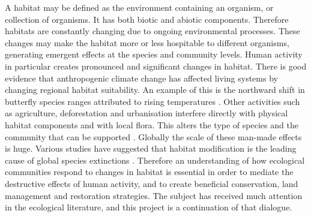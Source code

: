%	 
%	




A habitat may be defined as the environment containing an organism, or collection of organisms. It has both biotic and abiotic components. Therefore habitats are constantly changing due to ongoing environmental processes. These changes may make the habitat more or less hospitable to different organisms, generating emergent effects at the species and community levels. Human activity in particular creates pronounced and significant changes in habitat. There is good evidence \cite{parmesan2003globally} that anthropogenic climate change has affected living systems by changing regional habitat suitability. An example of this is the northward shift in butterfly species ranges attributed to rising temperatures \cite{parmesan1999poleward}. Other activities such as agriculture, deforestation and urbanisation interfere directly with physical habitat components and with local flora. This alters the type of species and the community that can be supported \cite{bossio2005soil, kremen2007pollination}. Globally the scale of these man-made effects is huge. Various studies have suggested that habitat modification is the leading cause of global species extinctions \cite{foley2005global,tylianakis2007habitat}. Therefore an understanding of how ecological communities respond to changes in habitat is essential in order to mediate the destructive effects of human activity, and to create beneficial conservation, land management and restoration strategies. The subject has received much attention in the ecological literature, and this project is a continuation of that dialogue.

